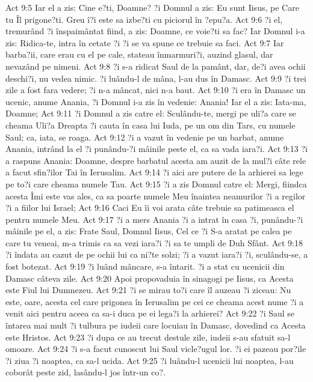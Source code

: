 Act 9:5  Iar el a zis: Cine e?ti, Doamne? ?i Domnul a zis: Eu sunt Iisus, pe Care tu Îl prigone?ti. Greu î?i este sa izbe?ti cu piciorul în ?epu?a.
Act 9:6  ?i el, tremurând ?i înspaimântat fiind, a zis: Doamne, ce voie?ti sa fac? Iar Domnul i-a zis: Ridica-te, intra în cetate ?i ?i se va spune ce trebuie sa faci.
Act 9:7  Iar barba?ii, care erau cu el pe cale, stateau înmarmuri?i, auzind glasul, dar nevazând pe nimeni.
Act 9:8  ?i s-a ridicat Saul de la pamânt, dar, de?i avea ochii deschi?i, nu vedea nimic. ?i luându-l de mâna, l-au dus în Damasc.
Act 9:9  ?i trei zile a fost fara vedere; ?i n-a mâncat, nici n-a baut.
Act 9:10  ?i era în Damasc un ucenic, anume Anania, ?i Domnul i-a zis în vedenie: Anania! Iar el a zis: Iata-ma, Doamne;
Act 9:11  ?i Domnul a zis catre el: Sculându-te, mergi pe uli?a care se cheama Uli?a Dreapta ?i cauta în casa lui Iuda, pe un om din Tars, cu numele Saul; ca, iata, se roaga.
Act 9:12  ?i a vazut în vedenie pe un barbat, anume Anania, intrând la el ?i punându-?i mâinile peste el, ca sa vada iara?i.
Act 9:13  ?i a raspuns Anania: Doamne, despre barbatul acesta am auzit de la mul?i câte rele a facut sfin?ilor Tai în Ierusalim.
Act 9:14  ?i aici are putere de la arhierei sa lege pe to?i care cheama numele Tau.
Act 9:15  ?i a zis Domnul catre el: Mergi, fiindca acesta Îmi este vas ales, ca sa poarte numele Meu înaintea neamurilor ?i a regilor ?i a fiilor lui Israel;
Act 9:16  Caci Eu îi voi arata câte trebuie sa patimeasca el pentru numele Meu.
Act 9:17  ?i a mers Anania ?i a intrat în casa ?i, punându-?i mâinile pe el, a zis: Frate Saul, Domnul Iisus, Cel ce ?i S-a aratat pe calea pe care tu veneai, m-a trimis ca sa vezi iara?i ?i sa te umpli de Duh Sfânt.
Act 9:18  ?i îndata au cazut de pe ochii lui ca ni?te solzi; ?i a vazut iara?i ?i, sculându-se, a fost botezat.
Act 9:19  ?i luând mâncare, s-a întarit. ?i a stat cu ucenicii din Damasc câteva zile.
Act 9:20  Apoi propovaduia în sinagogi pe Iisus, ca Acesta este Fiul lui Dumnezeu.
Act 9:21  ?i se mirau to?i care îl auzeau ?i ziceau: Nu este, oare, acesta cel care prigonea în Ierusalim pe cei ce cheama acest nume ?i a venit aici pentru aceea ca sa-i duca pe ei lega?i la arhierei?
Act 9:22  ?i Saul se întarea mai mult ?i tulbura pe iudeii care locuiau în Damasc, dovedind ca Acesta este Hristos.
Act 9:23  ?i dupa ce au trecut destule zile, iudeii s-au sfatuit sa-l omoare.
Act 9:24  ?i s-a facut cunoscut lui Saul vicle?ugul lor. ?i ei pazeau por?ile ?i ziua ?i noaptea, ca sa-l ucida.
Act 9:25  ?i luându-l ucenicii lui noaptea, l-au coborât peste zid, lasându-l jos într-un co?.
